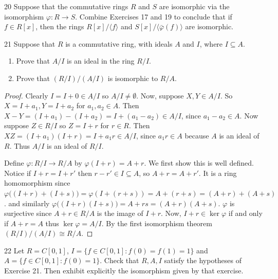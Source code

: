 \newpage

\begin{problem}{20}
    Suppose that the commutative rings $R$ and $S$ are isomorphic via the isomorphism
    $\varphi : R \to S$. Combine Exercises 17 and 19 to conclude that if $f \in R[x]$,
    then the rings $R[x]/\langle f \rangle$ and $S[x]/\langle \bar{\varphi}(f) \rangle$
    are isomorphic.
\end{problem}
\unsolved

\begin{problem}{21}
Suppose that $R$ is a commutative ring, with ideals $A$ and $I$, where $I \subseteq A$.
\begin{enumerate}
    \item[(a)] Prove that $A/I$ is an ideal in the ring $R/I$.
    \item[(b)] Prove that $(R/I)/(A/I)$ is isomorphic to $R/A$.
\end{enumerate}
\end{problem}
\solved

\begin{proof}
    Clearly $I = I + 0 \in A/I$ so $A/I \ne \emptyset$.
    Now, suppose $X, Y \in A/I$. So $X = I + a_1, Y = I + a_2$
        for $a_1, a_2 \in A$.
    Then $X - Y = (I + a_1) - (I + a_2) = I + (a_1 - a_2) \in A/I$,
        since $a_1 - a_2 \in A$.
    Now suppose $Z \in R/I$ so $Z = I + r$ for $r \in R$.
    Then $XZ = (I + a_1)(I + r) = I + a_1 r \in A/I$,
        since $a_1 r \in A$ because $A$ is an ideal of $R$.
    Thus $A/I$ is an ideal of $R/I$.

    Define $\varphi : R/I \to R/A$ by $\varphi(I + r) = A + r$.
    We first show this is well defined.
    Notice if $I + r = I + r'$ then $r - r' \in I \subseteq A$,
        so $A + r = A + r'$.
    It is a ring homomorphism since $\varphi\big((I + r) + (I + s)\big) = \varphi(I + (r+s)) = A + (r + s)
            = (A + r) + (A + s)$.
    and similarly $\varphi\big((I+r)(I+s)\big) = A + rs = (A+r)(A+s)$.
    $\varphi$ is surjective since $A + r \in R/A$ is the image
        of $I + r$.
    Now, $I + r \in \ker \varphi$ if and only if $A + r = A$ thus $\ker \varphi = A/I$.
    By the first isomorphism theorem $(R/I)/(A/I) \cong R/A$.
\end{proof}

\begin{problem}{22}
    Let $R = C[0, 1]$, $I = \{f \in C[0, 1] : f(0) = f(1) = 1\}$ and
    $A = \{f \in C[0, 1] : f(0) = 1\}$. Check that $R, A, I$ satisfy the hypotheses of
    Exercise 21. Then exhibit explicitly the isomorphism given by that exercise.
\end{problem}
\unsolved

